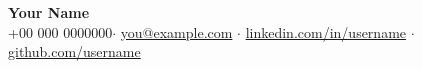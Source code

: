 \newcommand{\cvname}{Your Name}
\newcommand{\cvphone}{+00 000 0000000}
\newcommand{\cvemail}{you@example.com}
\newcommand{\cvlinkedin}{linkedin.com/in/username}
\newcommand{\cvlinkedinurl}{https://www.linkedin.com/in/username/}
\newcommand{\cvgithub}{github.com/username}
\newcommand{\cvgithuburl}{https://github.com/username}


\begin{center}
    \textbf{\Huge \cvname} \\ \vspace{5pt}
    \small
    \cvphone $\cdot$
    \href{mailto:\cvemail}{\cvemail} $\cdot$
    \href{\cvlinkedinurl}{\cvlinkedin} $\cdot$
    \href{\cvgithuburl}{\cvgithub}
\end{center}